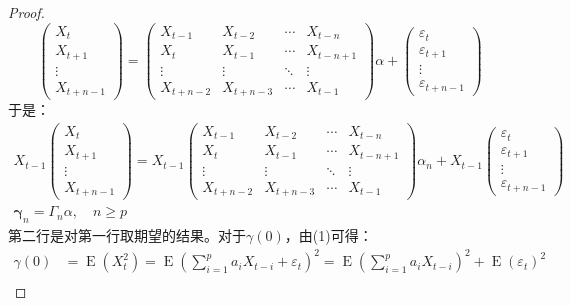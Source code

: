 \begin{proof}
\begin{equation*}
		\begin{pmatrix}
			X_t \\
			X_{t+1} \\
			\vdots \\
			X_{t+n-1}
		\end{pmatrix}=
		\begin{pmatrix}
			X_{t-1} & X_{t-2} & \cdots & X_{t-n} \\
			X_{t} & X_{t-1} & \cdots & X_{t-n+1} \\
			\vdots & \vdots & \ddots & \vdots \\
			X_{t+n-2} & X_{t+n-3} & \cdots & X_{t-1}
		\end{pmatrix}\alpha+
		\begin{pmatrix}
			\varepsilon_t \\
			\varepsilon_{t+1} \\
			\vdots \\
			\varepsilon_{t+n-1}
		\end{pmatrix}
	\end{equation*}
	于是：
	\begin{gather*}
		X_{t-1}
		\begin{pmatrix}
			X_t \\
			X_{t+1} \\
			\vdots \\
			X_{t+n-1}
		\end{pmatrix}=X_{t-1}
		\begin{pmatrix}
			X_{t-1} & X_{t-2} & \cdots & X_{t-n} \\
			X_{t} & X_{t-1} & \cdots & X_{t-n+1} \\
			\vdots & \vdots & \ddots & \vdots \\
			X_{t+n-2} & X_{t+n-3} & \cdots & X_{t-1}
		\end{pmatrix}\alpha_n+X_{t-1}
		\begin{pmatrix}
			\varepsilon_t \\
			\varepsilon_{t+1} \\
			\vdots \\
			\varepsilon_{t+n-1}
		\end{pmatrix} \\
		\boldsymbol{\gamma}_n=\Gamma_n\alpha,\quad n\geqslant p
	\end{gather*}
	第二行是对第一行取期望的结果。对于$\gamma(0)$，由(1)可得：
	\begin{align*}
		\gamma(0)&=\operatorname{E}(X_t^2)=\operatorname{E}\left(\sum_{i=1}^{p}a_iX_{t-i}+\varepsilon_t\right)^2=\operatorname{E}\left(\sum_{i=1}^{p}a_iX_{t-i}\right)^2+\operatorname{E}(\varepsilon_t)^2 \\

\end{align*}
\end{proof}
